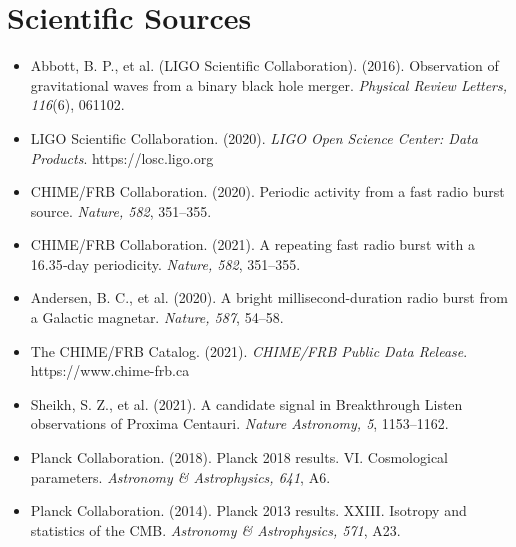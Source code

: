\documentclass[11pt, letterpaper, openany]{book}
\begin{document}

\section*{Scientific Sources}

\begin{itemize}

    \item Abbott, B. P., et al. (LIGO Scientific Collaboration). (2016). Observation of gravitational waves from a binary black hole merger. \textit{Physical Review Letters, 116}(6), 061102.

    \item LIGO Scientific Collaboration. (2020). \textit{LIGO Open Science Center: Data Products}. https://losc.ligo.org

    \item CHIME/FRB Collaboration. (2020). Periodic activity from a fast radio burst source. \textit{Nature, 582}, 351–355.

    \item CHIME/FRB Collaboration. (2021). A repeating fast radio burst with a 16.35‑day periodicity. \textit{Nature, 582}, 351–355.

    \item Andersen, B. C., et al. (2020). A bright millisecond-duration radio burst from a Galactic magnetar. \textit{Nature, 587}, 54–58.

    \item The CHIME/FRB Catalog. (2021). \textit{CHIME/FRB Public Data Release}. https://www.chime-frb.ca

    \item Sheikh, S. Z., et al. (2021). A candidate signal in Breakthrough Listen observations of Proxima Centauri. \textit{Nature Astronomy, 5}, 1153–1162.

    \item Planck Collaboration. (2018). Planck 2018 results. VI. Cosmological parameters. \textit{Astronomy \& Astrophysics, 641}, A6.

    \item Planck Collaboration. (2014). Planck 2013 results. XXIII. Isotropy and statistics of the CMB. \textit{Astronomy \& Astrophysics, 571}, A23.


\end{itemize}
\end{document}
